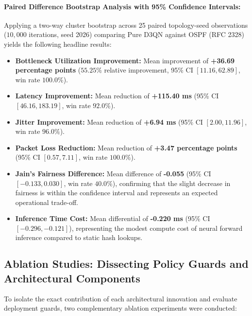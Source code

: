 \documentclass[12pt,a4paper,oneside]{report}
\begin{document}
\paragraph{Paired Difference Bootstrap Analysis with 95\% Confidence Intervals:}
Applying a two-way cluster bootstrap across 25 paired topology-seed observations ($10,000$ iterations, seed 2026) comparing Pure D3QN against OSPF (RFC 2328) yields the following headline results:
\begin{itemize}
    \item \textbf{Bottleneck Utilization Improvement:} Mean improvement of \textbf{+36.69 percentage points} ($55.25\%$ relative improvement, 95\% CI $[11.16, 62.89]$, win rate $100.0\%$).
    \item \textbf{Latency Improvement:} Mean reduction of \textbf{+115.40 ms} (95\% CI $[46.16, 183.19]$, win rate $92.0\%$).
    \item \textbf{Jitter Improvement:} Mean reduction of \textbf{+6.94 ms} (95\% CI $[2.00, 11.96]$, win rate $96.0\%$).
    \item \textbf{Packet Loss Reduction:} Mean reduction of \textbf{+3.47 percentage points} (95\% CI $[0.57, 7.11]$, win rate $100.0\%$).
    \item \textbf{Jain's Fairness Difference:} Mean difference of \textbf{-0.055} (95\% CI $[-0.133, 0.030]$, win rate $40.0\%$), confirming that the slight decrease in fairness is within the confidence interval and represents an expected operational trade-off.
    \item \textbf{Inference Time Cost:} Mean differential of \textbf{-0.220 ms} (95\% CI $[-0.296, -0.121]$), representing the modest compute cost of neural forward inference compared to static hash lookups.
\end{itemize}

\subsection{Ablation Studies: Dissecting Policy Guards and Architectural Components}
To isolate the exact contribution of each architectural innovation and evaluate deployment guards, two complementary ablation experiments were conducted:
\end{document}

